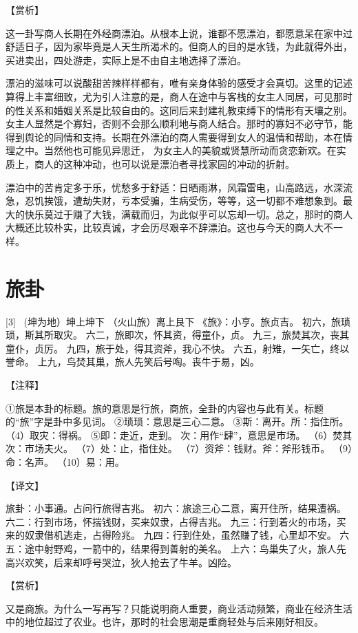 \documentclass[12pt,UTF8]{ctexbook}
\begin{document}
【赏析】

这一卦写商人长期在外经商漂泊。从根本上说，谁都不愿漂泊，都愿意呆在家中过舒适日子，因为家毕竟是人天生所渴术的。但商人的目的是水钱，为此就得外出，买进卖出，四处游走，实际上是不由自主地选择了漂泊。

漂泊的滋味可以说酸甜苦辣样样都有，唯有亲身体验的感受才会真切。这里的记述算得上丰富细致，尤为引人注意的是，商人在途中与客栈的女主人同居，可见那时的性关系和婚姻关系是比较自由的。这同后来封建礼教束缚下的情形有天壤之别。女主人显然是个寡妇，否则不会那么顺利地与商人结合。那时的寡妇不必守节，能得到舆论的同情和支持。长期在外漂泊的商人需要得到女人的温情和帮助，本在情理之中。当然他也可能见异思迁， 为女主人的美貌或贤慧所动而贪恋新欢。在实质上，商人的这种冲动，也可以说是漂泊者寻找家园的冲动的折射。

漂泊中的苦肯定多于乐，忧愁多于舒适：日晒雨淋，风霜雷电，山高路远，水深流急，忍饥挨饿，遭劫失财，亏本受骗，生病受伤，等等，这一切都不难想象到。最大的快乐莫过于赚了大钱，满载而归，为此似乎可以忘却一切。总之，那时的商人大概还比较朴实，比较真诚，才会历尽艰辛不辞漂泊。这也与今天的商人大不一样。

\chapter{旅卦}
[3] \ (坤为地）坤上坤下
（火山旅）离上艮下
《旅》：小亨。旅贞吉。
初六，旅琐琐，斯其所取灾。
六二，旅即次，怀其资，得童仆，贞。
九三，旅焚其次，丧其童仆，贞厉。
九四，旅于处，得其资斧，我心不快。
六五，射雉，一矢亡，终以誉命。
上九，鸟焚其巢，旅人先笑后号啕。丧牛于易，凶。

【注释】

①旅是本卦的标题。旅的意思是行旅，商旅，全卦的内容也与此有关。标题的“旅”字是卦中多见词。
②琐琐：意思是三心二意。
③斯：离开。所：指住所。
（4）取灾：得祸。
⑤即：走近，走到。 次：用作“肆”，意思是市场。
（6）焚其次：市场夫火。
（7）处：止，指住处。
（7）资斧：钱财。斧：斧形钱币。
（9）命：名声。
（10）易：用。

【译文】

旅卦：小事通。占问行旅得吉兆。
初六：旅途三心二意，离开住所，结果遭祸。
六二：行到市场，怀揣钱财，买来奴隶，占得吉兆。
九三：行到着火的市场，买来的奴隶借机逃走，占得险兆。
九四：行到住处，虽然赚了钱，心里却不安。
六五：途中射野鸡，一箭中的，结果得到善射的美名。
上六：鸟巢失了火，旅人先高兴欢笑，后来却呼号哭泣，狄人抢去了牛羊。凶险。

【赏析】

又是商旅。为什么一写再写？只能说明商人重要，商业活动频繁，商业在经济生活中的地位超过了农业。也许，那时的社会思潮是重商轻处与后来刚好相反。
\end{document}
